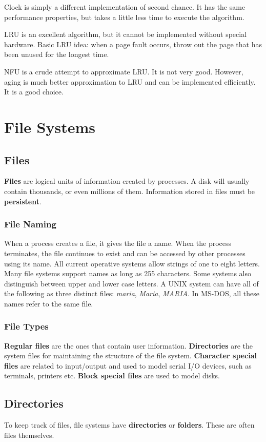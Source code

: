 \documentclass[11pt,a4paper]{article}
\begin{document}
Clock is simply a different implementation of second chance. It has the same performance properties, but takes a little less time to execute the algorithm. 

LRU is an excellent algorithm, but it cannot be implemented without special hardware. Basic LRU idea: when a page fault occurs, throw out the page that has been unused for the longest time.

NFU is a crude attempt to approximate LRU. It is not very good. However, aging is much better approximation to LRU and can be implemented efficiently. It is a good choice.

\section{File Systems}
\subsection{Files}
\textbf{Files} are logical units of information created by processes. A disk will usually contain thousands, or even millions of them. Information stored in files must be \textbf{persistent}.

\subsubsection{File Naming}
When a process creates a file, it gives the file a name. When the process terminates, the file continues to exist and can be accessed by other processes using its name. All current operative systems allow strings of one to eight letters. Many file systems support names as long as 255 characters. Some systems also distinguish between upper and lower case letters. A UNIX system can have all of the following as three distinct files: \textit{maria}, \textit{Maria}, \textit{MARIA}. In MS-DOS, all these names refer to the same file.

\subsubsection{File Types}
\textbf{Regular files} are the ones that contain user information. \textbf{Directories} are the system files for maintaining the structure of the file system. \textbf{Character special files} are related to input/output and used to model serial I/O devices, such as terminals, printers etc. \textbf{Block special files} are used to model disks. 

\subsection{Directories}
To keep track of files, file systems have \textbf{directories} or \textbf{folders}. These are often files themselves.
\end{document}
